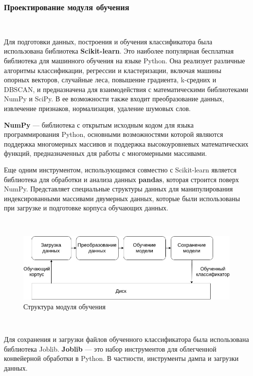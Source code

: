 \newpage
\subsubsection{Проектирование модуля обучения}
\

Для подготовки данных, построения и обучения классификатора была использована библиотека \textbf{Scikit-learn}.\cite{Scikit} Это наиболее популярная бесплатная библиотека для машинного обучения на языке Python. Она реализует различные алгоритмы классификации, регрессии и кластеризации, включая машины опорных векторов, случайные леса, повышение градиента, k-средних и DBSCAN, и предназначена для взаимодействия с математическими библиотеками NumPy и SciPy. В ее возможности также входит преобразование данных, извлечение признаков, нормализация, удаление шумовых слов.

\textbf{NumPy} — библиотека с открытым исходным кодом для языка программирования Python, основными возможностями которой являются поддержка многомерных массивов и поддержка высокоуровневых математических функций, предназначенных для работы с многомерными массивами\cite{NumPy}.

Еще одним инструментом, использующимся совместно с Scikit-learn является библиотека для обработки и анализа данных \textbf{pandas}, которая строится поверх NumPy. Представляет специальные структуры данных для манипулирования индексированными массивами двумерных данных, которые были использованы при загрузке и подготовке корпуса обучающих данных\cite{pandas}.

\

  \begin{figure}[h!]
    \centering
    \setlength{\fboxsep}{5pt}
    \includegraphics[width=.99\textwidth]{img/learn-module}
    \vspace*{6pt}
    \caption{Структура модуля обучения}\label{fig:project-tree}
  \end{figure}

 \

Для сохранения и загрузки файлов обученного классификатора была использована библиотека Joblib. \textbf{Joblib} — это набор инструментов для облегченной конвейерной обработки в Python. В частности, инструменты дампа и загрузки данных\cite{Joblib}.

